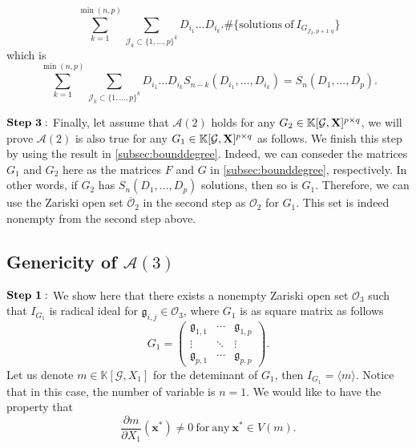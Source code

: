 \documentclass[11pt]{article}
\numberwithin{Property}{section}
\numberwithin{Theorem}{section}
\numberwithin{Proposition}{section}
\numberwithin{Lemma}{section}
\numberwithin{Corollary}{section}
\numberwithin{Definition}{section}
\numberwithin{Remark}{section}
\numberwithin{Conjecture}{section}
\numberwithin{Problem}{section}
\numberwithin{Claim}{section}
\theoremstyle{definition}
\numberwithin{Example}{section}
\def\bar{\overline}
\newcommand{\field}{\mathbb{K}} %
\newcommand{\mat}[1]{\mathbf{\MakeUppercase{#1}}} %
\newcommand{\improve}[1]{\textcolor{blue}{#1}} %
\begin{document}
\[\sum_{k=1}^{\min(n,p)} \sum_{\mathcal{J}_k \subset\{1, \ldots, p\}^k}D_{i_1} \ldots D_{i_k} . \# \{\mathrm{solutions \ of \ } I_{G_{\mathcal{J}_k, p+1:q}}\}\] which is 
\[
\sum_{k=1}^{\min(n,p)} \sum_{\mathcal{J}_k \subset\{1, \ldots, p\}^k}D_{i_1} \ldots D_{i_k}S_{n-k}(D_{i_1}, \ldots, D_{i_k}) = S_n(D_1, \ldots, D_p). 
\]

$\bf{Step \ 3:}$ Finally, let assume that $\mathcal{A}(2)$ holds for any $G_2 \in \field[\mathcal{G}, \mat{X}]^{p \times q}$, we will prove $\mathcal{A}(2)$ is also true for any $G_1 \in \field[\mathcal{G}, \mat{X}]^{p \times q}$ as follows. We finish this step by using the result in \improve{\cref{subsec:bounddegree}}. Indeed, we can conseder the matrices $G_1$ and $G_2$ here as the matrices $F$ and $G$ in \cref{subsec:bounddegree}, respectively. In other words, if $G_2$ has $S_n(D_1, \ldots, D_p)$ solutions, then so is $G_1$. Therefore, we can use the Zariski open set $\bar{\mathcal{O}}_2$ in the second step as ${\mathcal{O}_2}$ for $G_1$. This set is indeed nonempty from the second step above. 
\subsection{Genericity of $\mathcal{A}(3)$} 
$\bf{Step \ 1:}$ We show here that there exists a nonempty Zariski open set $\mathcal{O}_3$ such that $I_{G_1}$ is radical ideal for $\mathfrak{g}_{i,j} \in \mathcal{O}_3$, where $G_1$ is as square matrix as follows 
\[
G_1 = \left( \begin{matrix}
\mathfrak{g}_{1,1}  & \cdots  & \mathfrak{g}_{1, p}\\
\vdots & \ddots & \vdots \\
\mathfrak{g}_{p,1} & \cdots  & \mathfrak{g}_{p, p}
\end{matrix} \right).
\] Let us denote $m \in \field[\mathcal{G}, X_1]$ for the deteminant of $G_1$, then $I_{G_1} = \langle m \rangle$. Notice that in this case, the number of variable is $n = 1$. We would like to have the property that \[\frac{\partial m}{\partial X_1}(\mathbf{x}^*) \ne 0 \ \mathrm{for \ any} \ \mathbf{x}^* \in V(m). \] 
\end{document}
